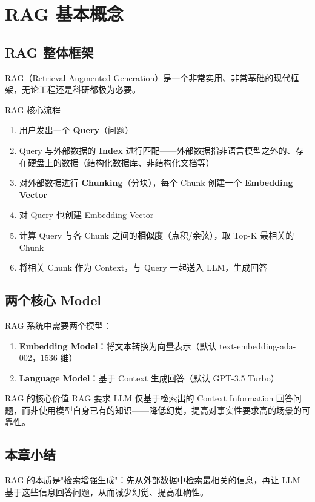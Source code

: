 \section{RAG 基本概念}

\subsection{RAG 整体框架}

RAG（Retrieval-Augmented Generation）是一个非常实用、非常基础的现代框架，无论工程还是科研都极为必要。

\begin{importantbox}{RAG 核心流程}
\begin{enumerate}
    \item 用户发出一个 \textbf{Query}（问题）
    \item Query 与外部数据的 \textbf{Index} 进行匹配——外部数据指非语言模型之外的、存在硬盘上的数据（结构化数据库、非结构化文档等）
    \item 对外部数据进行 \textbf{Chunking}（分块），每个 Chunk 创建一个 \textbf{Embedding Vector}
    \item 对 Query 也创建 Embedding Vector
    \item 计算 Query 与各 Chunk 之间的\textbf{相似度}（点积/余弦），取 Top-K 最相关的 Chunk
    \item 将相关 Chunk 作为 Context，与 Query 一起送入 LLM，生成回答
\end{enumerate}
\end{importantbox}

\subsection{两个核心 Model}

RAG 系统中需要两个模型：
\begin{enumerate}
    \item \textbf{Embedding Model}：将文本转换为向量表示（默认 text-embedding-ada-002，1536 维）
    \item \textbf{Language Model}：基于 Context 生成回答（默认 GPT-3.5 Turbo）
\end{enumerate}

\begin{knowledgebox}{RAG 的核心价值}
RAG 要求 LLM 仅基于检索出的 Context Information 回答问题，而非使用模型自身已有的知识——降低幻觉，提高对事实性要求高的场景的可靠性。
\end{knowledgebox}

\subsection{本章小结}

RAG 的本质是"检索增强生成"：先从外部数据中检索最相关的信息，再让 LLM 基于这些信息回答问题，从而减少幻觉、提高准确性。

